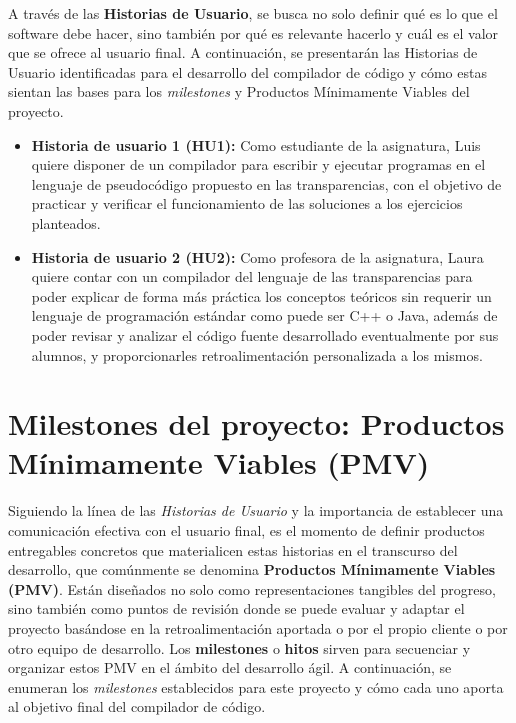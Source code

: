 A través de las \textbf{Historias de Usuario}, se busca no solo definir qué es lo que el software debe hacer, sino también por qué es relevante hacerlo y cuál es el valor que se ofrece al usuario final. A continuación, se presentarán las Historias de Usuario identificadas para el desarrollo del compilador de código y cómo estas sientan las bases para los \textit{milestones} y Productos Mínimamente Viables del proyecto.

\begin{itemize}
    \item \textbf{Historia de usuario 1 (HU1):} Como estudiante de la asignatura, Luis quiere disponer de un compilador para escribir y ejecutar programas en el lenguaje de pseudocódigo propuesto en las transparencias, con el objetivo de practicar y verificar el funcionamiento de las soluciones a los ejercicios planteados.
    \item \textbf{Historia de usuario 2 (HU2):} Como profesora de la asignatura, Laura quiere contar con un compilador del lenguaje de las transparencias para poder explicar de forma más práctica los conceptos teóricos sin requerir un lenguaje de programación estándar como puede ser C++ o Java, además de poder revisar y analizar el código fuente desarrollado eventualmente por sus alumnos, y proporcionarles retroalimentación personalizada a los mismos.
\end{itemize}

\section{Milestones del proyecto: Productos Mínimamente Viables (PMV)}

Siguiendo la línea de las \textit{Historias de Usuario} y la importancia de establecer una comunicación efectiva con el usuario final, es el momento de definir productos entregables concretos que materialicen estas historias en el transcurso del desarrollo, que comúnmente se denomina \textbf{Productos Mínimamente Viables (PMV)}. Están diseñados no solo como representaciones tangibles del progreso, sino también como puntos de revisión donde se puede evaluar y adaptar el proyecto basándose en la retroalimentación aportada o por el propio cliente o por otro equipo de desarrollo. Los \textbf{milestones} o \textbf{hitos} sirven para secuenciar y organizar estos PMV en el ámbito del desarrollo ágil. A continuación, se enumeran los \textit{milestones} establecidos para este proyecto y cómo cada uno aporta al objetivo final del compilador de código.

